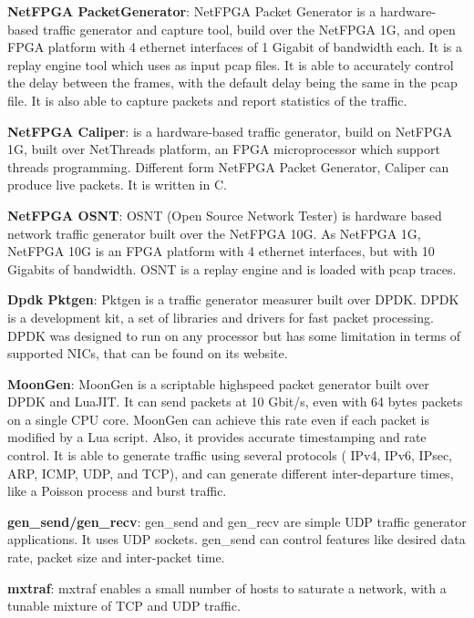 \textbf{NetFPGA PacketGenerator}\cite{web-netfpgapacketgenerator}: NetFPGA Packet Generator is a hardware-based traffic generator and capture tool, build over the NetFPGA 1G, and open FPGA platform with 4 ethernet interfaces of 1 Gigabit of bandwidth each. It is a replay engine tool which uses as input pcap files. It is able to accurately control the delay between the frames, with the default delay being the same in the pcap file. It is also able to capture packets and report statistics of the traffic. 


\textbf{NetFPGA Caliper}\cite{web-caliper}: is a hardware-based traffic generator, build on NetFPGA 1G, built over NetThreads platform, an FPGA microprocessor which support threads programming. Different form NetFPGA Packet Generator, Caliper can produce live packets. It is written in C. 

\textbf{NetFPGA OSNT}\cite{web-osnt}:  OSNT (Open Source Network Tester) is hardware based network traffic generator built over the NetFPGA 10G. As NetFPGA 1G, NetFPGA 10G is an FPGA platform with 4 ethernet interfaces, but with 10 Gigabits of bandwidth. OSNT is a replay engine and is loaded with pcap traces. 


\textbf{Dpdk Pktgen}\cite{web-dpdk-pktgen}: Pktgen is a traffic generator measurer built over DPDK. DPDK is a development kit, a set of libraries and drivers for fast packet processing. DPDK was designed to run on any processor but has some limitation in terms of supported NICs, that can be found on its website.

\textbf{MoonGen}\cite{moongen-paper}\cite{web-moongen}: MoonGen is a scriptable highspeed packet generator built over DPDK and LuaJIT. It can send packets at 10 Gbit/s, even with 64 bytes packets on a single CPU core. MoonGen can achieve this rate even if each packet is modified by a Lua script. Also, it provides accurate timestamping and rate control. It is able to generate traffic using several protocols ( IPv4, IPv6, IPsec, ARP, ICMP, UDP, and TCP), and can generate different inter-departure times, like a Poisson process and burst traffic. 

\textbf{gen\_send/gen\_recv}\cite{web-gensend-genrecv}:  gen\_send and gen\_recv are simple UDP traffic generator applications. It uses UDP sockets. gen\_send can control features like desired data rate, packet size and inter-packet time. 

\textbf{mxtraf}\cite{web-mxtraf}:  mxtraf enables a small number of hosts to saturate a network, with a tunable mixture of TCP and UDP traffic.

